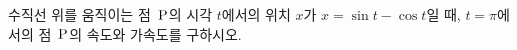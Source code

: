 수직선 위를 움직이는 점~$\mathrm{P}$의 시각 $t$에서의 위치 $x$가 $x=\sin t-\cos t$일 때, $t=\pi$에서의 점~$\mathrm{P}$의 속도와 가속도를 구하시오.
